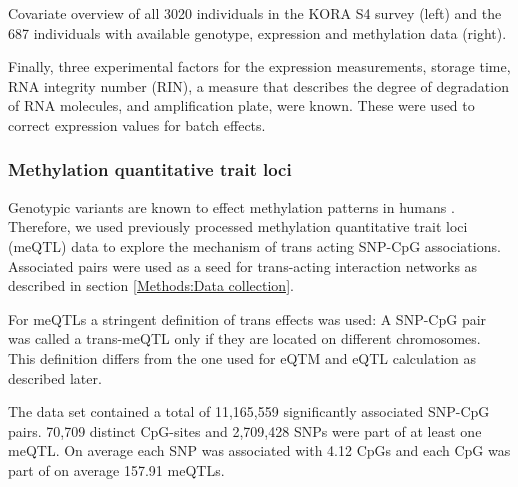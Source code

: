 \documentclass[a4paper,12pt,twoside,openright]{article}
\begin{document}
\begin{table}[h!]
  	\begin{minipage}{.45\textwidth}
    \end{minipage}
    \hfill
     \begin{minipage}{.45\linewidth}
    \end{minipage}%
    \caption{Covariate overview of all 3020 individuals in the KORA S4 survey (left) and the 687 individuals with available genotype, expression and methylation data (right).}
	\label{tab:covariate.overview}
\end{table}

Finally, three experimental factors for the expression measurements, storage time, RNA integrity number (RIN), a measure that describes the degree of degradation of RNA molecules\cite{Schroeder2006}, and amplification plate, were known. These were used to correct expression values for batch effects. 

\subsubsection{Methylation quantitative trait loci}
\label{Data:meQTL}
Genotypic variants are known to effect methylation patterns in humans \cite{Jones2013}. Therefore, we used previously processed methylation quantitative trait loci (meQTL) data to explore the mechanism of trans acting SNP-CpG associations. Associated pairs were used as a seed for trans-acting interaction networks as described in section \ref{Methods:Data collection}.

For meQTLs a stringent definition of trans effects was used: A SNP-CpG pair was called a trans-meQTL only if they are located on different chromosomes. This definition differs from the one used for eQTM and eQTL calculation as described later. 

The data set contained a total of 11,165,559 significantly associated SNP-CpG pairs. 
70,709 distinct CpG-sites and 2,709,428 SNPs were part of at least one meQTL. On average each SNP was associated with 4.12 CpGs and each CpG was part of on average 157.91 meQTLs.
\end{document}
